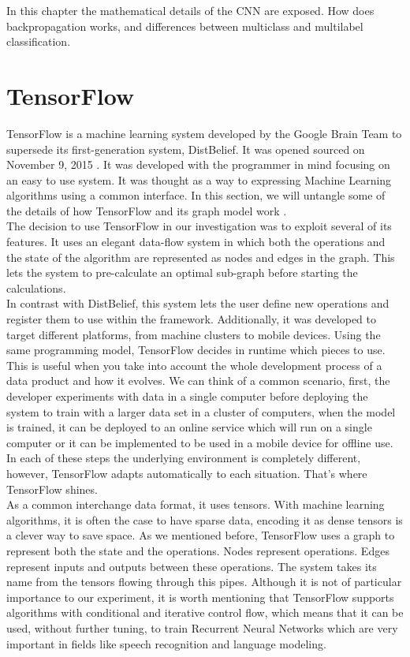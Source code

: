 In this chapter the mathematical details of the CNN are exposed. How does backpropagation works, and differences between multiclass and multilabel classification.\\

\section{TensorFlow}

TensorFlow is a machine learning system developed by the Google Brain Team to supersede its first-generation system, DistBelief. It was opened sourced on November 9, 2015 \cite{tensorflow2015-whitepaper}. It was developed with the programmer in mind focusing on an easy to use system. It was thought as a way to expressing Machine Learning algorithms using a common interface. In this section, we will untangle some of the details of how TensorFlow and its graph model work \cite{DBLP:journals/corr/AbadiBCCDDDGIIK16}.\\

The decision to use TensorFlow in our investigation was to exploit several of its features. It uses an elegant data-flow system in which both the operations and the state of the algorithm are represented as nodes and edges in the graph. This lets the system to pre-calculate an optimal sub-graph before starting the calculations.\\

In contrast with DistBelief, this system lets the user define new operations and register them to use within the framework. Additionally, it was developed to target different platforms, from machine clusters to mobile devices. Using the same programming model, TensorFlow decides in runtime which pieces to use. This is useful when you take into account the whole development process of a data product and how it evolves. We can think of a common scenario, first, the developer experiments with data in a single computer before deploying the system to train with a larger data set in a cluster of computers, when the model is trained, it can be deployed to an online service which will run on a single computer or it can be implemented to be used in a mobile device for offline use. In each of these steps the underlying environment is completely different, however, TensorFlow adapts automatically to each situation. That's where TensorFlow shines.\\


As a common interchange data format, it uses tensors. With machine learning algorithms, it is often the case to have sparse data, encoding it as dense tensors is a clever way to save space. As we mentioned before, TensorFlow uses a graph to represent both the state and the operations. Nodes represent operations. Edges represent inputs and outputs between these operations. The system takes its name from the tensors flowing through this pipes. Although it is not of particular importance to our experiment, it is worth mentioning that TensorFlow supports algorithms with conditional and iterative control flow, which means that it can be used, without further tuning, to train Recurrent Neural Networks which are very important in fields like speech recognition and language modeling.\\

